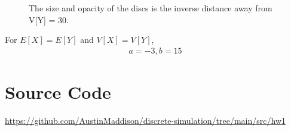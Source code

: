 \documentclass[twocolumn]{article}
\begin{document}
\vspace{-10pt}
\begin{figure}[H]
    \centering
    \vspace{-10pt}
    \caption{The size and opacity of the discs is the inverse distance away from V[Y] = 30.}
\end{figure}

\vspace{-10pt}
For $E[X]=E[Y]$ and $V[X]=V[Y]$,
\vspace{-10pt}
\begin{align*}
a=-3, b=15
\end{align*}


\section*{Source Code}
\href{https://github.com/AustinMaddison/discrete-simulation/tree/main/src/hw1}{https://github.com/AustinMaddison/discrete-simulation/tree/main/src/hw1}

%
%
\end{document}
